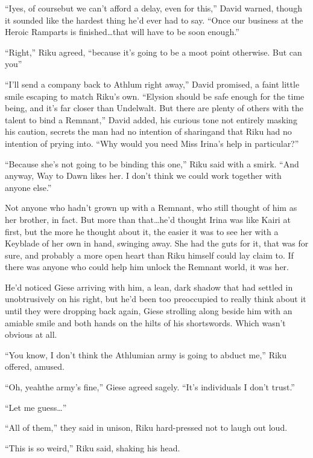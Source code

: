 ``I\textemdash yes, of course\textemdash but we can't afford a delay, even for this,'' David warned, though it sounded like the hardest thing he'd ever had to say. ``Once our business at the Heroic Ramparts is finished\ldots that will have to be soon enough.''

``Right,'' Riku agreed, ``because it's going to be a moot point otherwise. But can you\textemdash ''

``I'll send a company back to Athlum right away,'' David promised, a faint little smile escaping to match Riku's own. ``Elysion should be safe enough for the time being, and it's far closer than Undelwalt. But there are plenty of others with the talent to bind a Remnant,'' David added, his curious tone not entirely masking his caution, secrets the man had no intention of sharing\textemdash and that Riku had no intention of prying into. ``Why would you need Miss Irina's help in particular?''

``Because she's not going to be binding this one,'' Riku said with a smirk. ``And anyway, Way to Dawn likes her. I don't think we could work together with anyone else.''

Not anyone who hadn't grown up with a Remnant, who still thought of him as her brother, in fact. But more than that\ldots he'd thought Irina was like Kairi at first, but the more he thought about it, the easier it was to see her with a Keyblade of her own in hand, swinging away. She had the guts for it, that was for sure, and probably a more open heart than Riku himself could lay claim to. If there was anyone who could help him unlock the Remnant world, it was her.

He'd noticed Giese arriving with him, a lean, dark shadow that had settled in unobtrusively on his right, but he'd been too preoccupied to really think about it until they were dropping back again, Giese strolling along beside him with an amiable smile and both hands on the hilts of his shortswords. Which wasn't obvious at all.

``You know, I don't think the Athlumian army is going to abduct me,'' Riku offered, amused.

``Oh, yeah\textemdash the army's fine,'' Giese agreed sagely. ``It's individuals I don't trust.''

``Let me guess\ldots ''

``All of them,'' they said in unison, Riku hard-pressed not to laugh out loud.

``This is so weird,'' Riku said, shaking his head.


